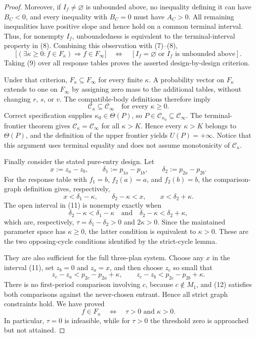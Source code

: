 \documentclass{article}
\begin{document}
\begin{proof}
Moreover, if \(I_f\ne\varnothing\) is unbounded above, no inequality defining it can have \(B_C<0\), and every inequality with \(B_C=0\) must have \(A_C>0\).  All remaining inequalities have positive slope and hence hold on a common terminal interval.  Thus, for nonempty \(I_f\), unboundedness is equivalent to the terminal-interval property in (8).  Combining this observation with (7)--(8),
\[
 \bigl[(\exists\kappa\ge0:f\in F_\kappa)\Longrightarrow f\in F_\infty\bigr]
 \quad\Longleftrightarrow\quad
 [I_f=\varnothing\text{ or }I_f\text{ is unbounded above}].
\tag{9}
\]
Taking (9) over all response tables proves the asserted design-by-design criterion.

Under that criterion, \(F_\kappa\subseteq F_\infty\) for every finite \(\kappa\).  A probability vector on \(F_\kappa\) extends to one on \(F_\infty\) by assigning zero mass to the additional tables, without changing \(r\), \(s\), or \(v\).  The compatible-body definitions therefore imply
\[
 \mathcal C_\kappa\subseteq\mathcal C_\infty
 \quad\text{for every }\kappa\ge0.
\tag{10}
\]
Correct specification supplies \(\kappa_0\in\Theta(P)\), so \(P\in\mathcal C_{\kappa_0}\subseteq\mathcal C_\infty\).  The terminal-frontier theorem gives \(\mathcal C_\kappa=\mathcal C_\infty\) for all \(\kappa>K\).  Hence every \(\kappa>K\) belongs to \(\Theta(P)\), and the definition of the upper frontier yields \(U(P)=+\infty\).  Notice that this argument uses terminal equality and does not assume monotonicity of \(\mathcal C_\kappa\).

Finally consider the stated pure-entry design.  Let
\[
 x:=z_a-z_b,
 \qquad
 \delta_1:=p_{1a}-p_{1b},
 \qquad
 \delta_2:=p_{2a}-p_{2b}.
\]
For the response table with \(f_1=b\), \(f_2(a)=a\), and \(f_2(b)=b\), the comparison-graph definition gives, respectively,
\[
 x<\delta_1-\kappa,
 \qquad
 \delta_2-\kappa<x,
 \qquad
 x<\delta_2+\kappa.
\tag{11}
\]
The open interval in (11) is nonempty exactly when
\[
 \delta_2-\kappa<\delta_1-\kappa
 \quad\text{and}\quad
 \delta_2-\kappa<\delta_2+\kappa,
\]
which are, respectively, \(\tau=\delta_1-\delta_2>0\) and \(2\kappa>0\).  Since the maintained parameter space has \(\kappa\ge0\), the latter condition is equivalent to \(\kappa>0\).  These are the two opposing-cycle conditions identified by the strict-cycle lemma.

They are also sufficient for the full three-plan system.  Choose any \(x\) in the interval (11), set \(z_b=0\) and \(z_a=x\), and then choose \(z_c\) so small that
\[
 z_c-z_a<p_{2c}-p_{2a}+\kappa,
 \qquad
 z_c-z_b<p_{2c}-p_{2b}+\kappa.
\tag{12}
\]
There is no first-period comparison involving \(c\), because \(c\notin M_1\), and (12) satisfies both comparisons against the never-chosen entrant.  Hence all strict graph constraints hold.  We have proved
\[
 f\in F_\kappa
 \quad\Longleftrightarrow\quad
 \tau>0\text{ and }\kappa>0.
\]
In particular, \(\tau=0\) is infeasible, while for \(\tau>0\) the threshold zero is approached but not attained.


\end{proof}
\end{document}
